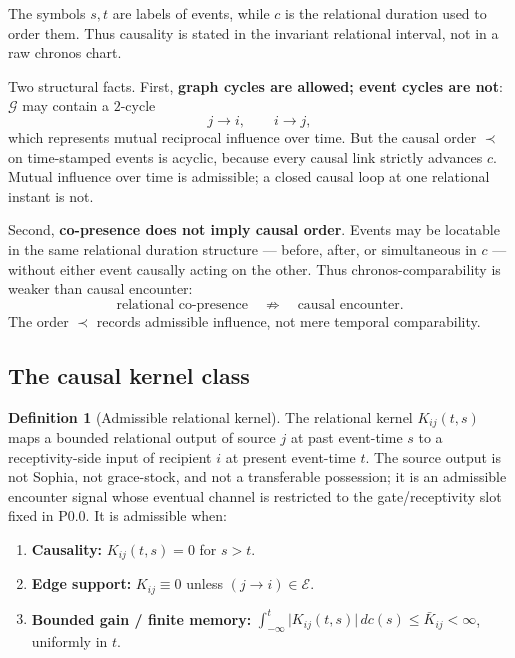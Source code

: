 \documentclass[11pt,a4paper]{article}
\def\mathfrak#1{#1}%
\def\emph#1{#1}%
\theoremstyle{definition}
\newtheorem{definition}{Definition}[section]
\theoremstyle{plain}
\theoremstyle{remark}
\begin{document}
The symbols $s,t$ are labels of events, while $\mathfrak c$ is the relational
duration used to order them. Thus causality is stated in the invariant relational
interval, not in a raw chronos chart.

Two structural facts. First, \textbf{graph cycles are allowed; event cycles are
not}: \(\mathcal G\) may contain a \(2\)-cycle
\[
j\to i,
\qquad
i\to j,
\]
which represents mutual reciprocal influence over time. But the causal order
\(\prec\) on time-stamped events is acyclic, because every causal link strictly
advances \(\mathfrak c\). Mutual influence over time is admissible; a closed causal
loop at one relational instant is not.

Second, \textbf{co-presence does not imply causal order}. Events may be locatable
in the same relational duration structure --- before, after, or simultaneous in
\(\mathfrak c\) --- without either event causally acting on the other. Thus
chronos-comparability is weaker than causal encounter:
\[
\text{relational co-presence}
\quad\not\Rightarrow\quad
\text{causal encounter}.
\]
The order \(\prec\) records admissible influence, not mere temporal comparability.

\subsection{The causal kernel class}

\begin{definition}[Admissible relational kernel]
The relational kernel $K_{ij}(t,s)$ maps a bounded relational output of source $j$
at past event-time $s$ to a receptivity-side input of recipient $i$ at present
event-time $t$. The source output is not Sophia, not grace-stock, and not a
transferable possession; it is an admissible encounter signal whose eventual channel
is restricted to the gate/receptivity slot fixed in P0.0. It is
\emph{admissible} when:
\begin{enumerate}[label=\textup{(K\arabic*)},leftmargin=1.5cm]
\item \textbf{Causality:} $K_{ij}(t,s)=0$ for $s>t$.
\item \textbf{Edge support:} $K_{ij}\equiv0$ unless $(j\!\to\!i)\in\mathcal E$.
\item \textbf{Bounded gain / finite memory:} $\displaystyle\int_{-\infty}^{t}\bigl|K_{ij}(t,s)\bigr|\,d\mathfrak c(s)\le\bar K_{ij}<\infty$, uniformly in $t$.
\end{enumerate}
\end{definition}
\end{document}
